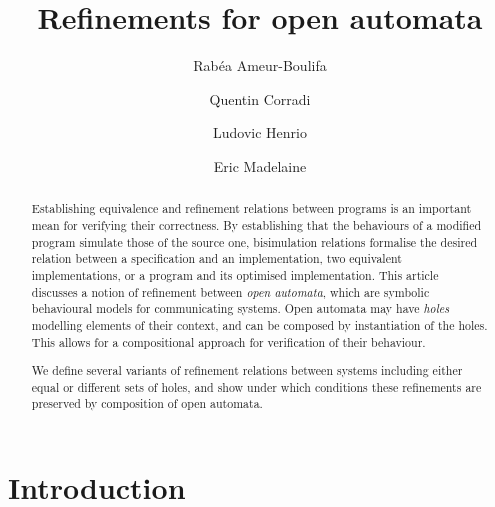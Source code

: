 \documentclass[runningheads]{llncs}
\begin{document}
%
\title{Refinements for open automata}
%
%
\author{
Rabéa Ameur-Boulifa \and
Quentin Corradi \and
Ludovic Henrio  \and
Eric Madelaine }
%
%
%
\maketitle              %
%
\begin{abstract}

Establishing equivalence and refinement relations between programs is an important mean for 
verifying their correctness. By establishing that the
behaviours of a modified program simulate those of the source one, bisimulation relations formalise the desired relation between a specification and an implementation, 
 two equivalent implementations, or a program and its optimised implementation.
This article discusses a notion of refinement between \emph{open automata}, which are symbolic
behavioural models for communicating systems. 
Open automata may have \emph{holes} modelling elements of their
context, and can be composed by instantiation of the holes. This allows for a compositional approach for
verification of their behaviour.

We define several variants of refinement relations between systems including either equal or different sets of holes, and 
show under which conditions these refinements are preserved by composition of open automata. 


\end{abstract}
%
%
%
\section{Introduction}
\end{document}
